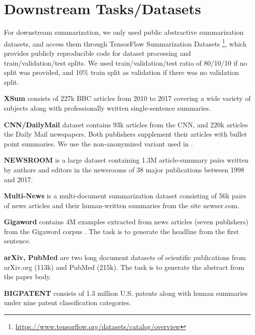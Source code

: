 \documentclass{article}
\begin{document}
\section{Downstream Tasks/Datasets}
\label{sec:exp_downstream_datasets}

For downstream summarization, we only used
public abstractive summarization datasets, and access
them through TensorFlow Summarization Datasets \footnote{\url{https://www.tensorflow.org/datasets/catalog/overview}}, which
provides publicly reproducible code for dataset processing and
train/validation/test splits. We used train/validation/test ratio of 80/10/10 if no split was provided, and 10\% train split as validation if there was no validation split.

\textbf{XSum} \citep{shashi-2018-xsum} consists of 227k
BBC articles from 2010 to 2017 covering a wide variety of subjects along with professionally written single-sentence summaries.

\textbf{CNN/DailyMail} \citep{hermann2015cnndm} dataset contains 93k articles from the CNN, and 220k articles the Daily Mail newspapers. Both publishers supplement their articles with bullet point summaries.
We use the non-anonymized variant used in \citet{see2017cnndm}.

\textbf{NEWSROOM} \citep{Grusky2018newsroom} is a large dataset containing 1.3M article-summary pairs written by authors and editors in the newsrooms of 38 major publications between 1998 and 2017.

\textbf{Multi-News} \citep{fabbri-etal-2019-multinews} is a multi-document summarization dataset consisting of 56k pairs of news articles and their human-written summaries from the site newser.com. 

\textbf{Gigaword} \citep{rush-etal-2015-neural} contains 4M
examples  extracted from news articles (seven publishers) from the Gigaword corpus \citep{graff2003gigaword}. The task is to generate
the headline from the first sentence.

\textbf{arXiv, PubMed} \citep{cohan-etal-2018-discourse-scientificpapers} are two long document datasets of scientific publications from arXiv.org (113k) and PubMed (215k). The task is to generate the abstract from the paper body.

\textbf{BIGPATENT} \citep{sharma-etal-2019-bigpatent} consists of 1.3 million  U.S. patents along with human summaries under nine patent classification categories.
\end{document}
